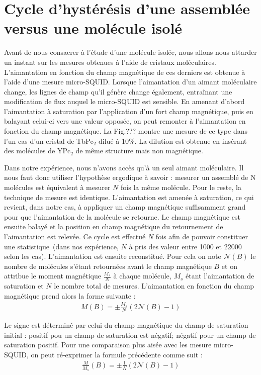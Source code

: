 \section{Cycle d’hystérésis d'une assemblée versus une molécule isolé}
Avant de nous consacrer à l'étude d'une molécule isolée, nous allons nous attarder un instant sur les mesures obtenues à l'aide de cristaux moléculaires. L'aimantation en fonction du champ magnétique de ces derniers est obtenue à l'aide d'une mesure micro-SQUID. Lorsque l'aimantation d'un aimant moléculaire change, les lignes de champ qu'il génère change également, entraînant une modification de flux auquel le micro-SQUID est sensible. En amenant d'abord l'aimantation à saturation par l'application d'un fort champ magnétique, puis en balayant celui-ci vers une valeur opposée, on peut remonter à l'aimantation en fonction du champ magnétique. La Fig.??? montre une mesure de ce type dans l'un cas d'un cristal de TbPc$_2$ dilué à 10\%. La dilution est obtenue en insérant des molécules de YPc$_2$ de même structure mais non magnétique.

Dans notre expérience, nous n'avons accès qu'à un seul aimant moléculaire. Il nous faut donc utiliser l'hypothèse ergodique à savoir : mesurer un assemblé de N molécules est équivalent à mesurer $N$ fois la même molécule. Pour le reste, la technique de mesure est identique. L'aimantation est amenée à saturation, ce qui revient, dans notre cas, à appliquer un champ magnétique suffisamment grand pour que l'aimantation de la molécule se retourne. Le champ magnétique est ensuite balayé et la position en champ magnétique du retournement de l'aimantation est relevée. Ce cycle est effectué $N$ fois afin de pouvoir constituer une statistique~(dans nos expérience, $N$ à pris des valeur entre 1000 et 22000 selon les cas). L'aimantation est ensuite reconstitué. Pour cela on note $\mathscr{N}(B)$ le nombre de molécules s'étant retournées avant le champ magnétique $B$ et on attribue le moment magnétique $\frac{M_s}{N}$ à chaque molécule, $M_s$ étant l'aimantation de saturation et $N$ le nombre total de mesures. L'aimantation en fonction du champ magnétique prend alors la forme suivante :
\begin{eqnarray}
M(B) =\pm \frac{M_s}{N}(2\mathscr{N}(B) -1)\nonumber
\end{eqnarray}

Le signe est déterminé par celui du champ magnétique du champ de saturation initial : positif pou un champ de saturation est négatif; négatif pour un champ de saturation positif. Pour une comparaison plus aisée avec les mesure micro-SQUID, on peut ré-exprimer la formule précédente comme suit :
\begin{eqnarray}
\frac{M}{M_s}(B) =\pm \frac{1}{N} (2\mathscr{N}(B) -1)
\end{eqnarray}

